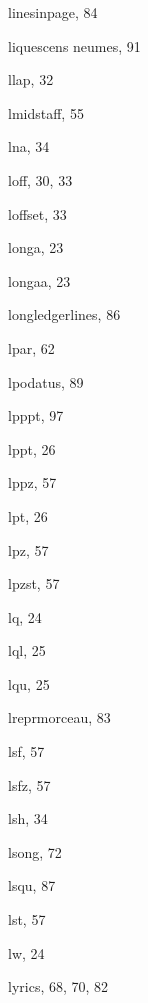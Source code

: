 \begin{theindex}
  \item {\Bslash linesinpage}, 84
  \item liquescens neumes, 91
  \item {\Bslash llap}, 32
  \item {\Bslash lmidstaff}, 55
  \item {\Bslash lna}, 34
  \item {\Bslash loff}, 30, 33
  \item {\Bslash loffset}, 33
  \item {\Bslash longa}, 23
  \item {\Bslash longaa}, 23
  \item {\Bslash longledgerlines}, 86
  \item {\Bslash lpar}, 62
  \item {\Bslash lpodatus}, 89
  \item {\Bslash lpppt}, 97
  \item {\Bslash lppt}, 26
  \item {\Bslash lppz}, 57
  \item {\Bslash lpt}, 26
  \item {\Bslash lpz}, 57
  \item {\Bslash lpzst}, 57
  \item {\Bslash lq}, 24
  \item {\Bslash lql}, 25
  \item {\Bslash lqu}, 25
  \item {\Bslash lreprmorceau}, 83
  \item {\Bslash lsf}, 57
  \item {\Bslash lsfz}, 57
  \item {\Bslash lsh}, 34
  \item {\Bslash lsong}, 72
  \item {\Bslash lsqu}, 87
  \item {\Bslash lst}, 57
  \item {\Bslash lw}, 24
  \item lyrics, 68, 70, 82

  \indexspace


\end{theindex}
